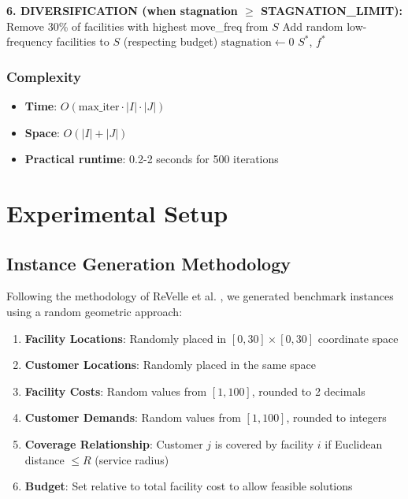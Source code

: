 \documentclass[11pt,a4paper]{article}
\begin{document}
\begin{algorithm}[H]
\caption{Tabu Search for MCLP (Part 3: Selection \& Updates)}
\begin{algorithmic}[1]

    \State \textbf{6. DIVERSIFICATION (when stagnation $\geq$ STAGNATION\_LIMIT):}
        \State Remove 30\% of facilities with highest move\_freq from $S$ 
        \State Add random low-frequency facilities to $S$ (respecting budget) 
        \State $\text{stagnation} \leftarrow 0$
    \EndIf
\EndFor
\State
\State \Return $S^*$, $f^*$ 
\end{algorithmic}
\end{algorithm}


\subsubsection{Complexity}
\begin{itemize}
  \item \textbf{Time}: $O(\text{max\_iter} \cdot |I| \cdot |J|)$
  \item \textbf{Space}: $O(|I| + |J|)$
  \item \textbf{Practical runtime}: 0.2-2 seconds for 500 iterations
\end{itemize}

\newpage
\section{Experimental Setup}

\subsection{Instance Generation Methodology}

Following the methodology of ReVelle et al. \cite{revelle2008}, we generated benchmark instances using a random geometric approach:

\begin{enumerate}
  \item \textbf{Facility Locations}: Randomly placed in $[0, 30] \times [0, 30]$ coordinate space
  \item \textbf{Customer Locations}: Randomly placed in the same space
  \item \textbf{Facility Costs}: Random values from $[1, 100]$, rounded to 2 decimals
  \item \textbf{Customer Demands}: Random values from $[1, 100]$, rounded to integers
  \item \textbf{Coverage Relationship}: Customer $j$ is covered by facility $i$ if Euclidean distance $\leq R$ (service radius)
  \item \textbf{Budget}: Set relative to total facility cost to allow feasible solutions
\end{enumerate}
\end{document}
